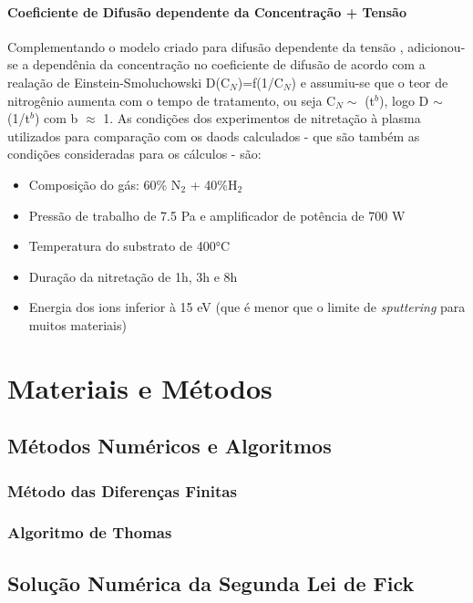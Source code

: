 \documentclass[]{politex}
\begin{document}
\subsubsection{Coeficiente de Difusão dependente da Concentração + Tensão}
\label{sec:comb-depc-stress}
	Complementando o modelo criado para difusão dependente da tensão \cite{galdikas2010stress}, adicionou-se a dependênia da concentração no coeficiente de difusão de acordo com a realação de Einstein-Smoluchowski D(C$_N$)=f(1/C$_N$) \cite{moskalioviene2012stress} e assumiu-se que o teor de nitrogênio aumenta com o tempo de tratamento, ou seja C$_N\sim$ (t$^b$), logo D $\sim$ (1/t$^b$) com b $\approx$ 1.
	As condições dos experimentos de nitretação à plasma utilizados para comparação com os daods calculados - que são também as condições consideradas para os cálculos - são: 
	\begin{itemize}
	 \item Composição do gás: 60\% N$_2$ + 40\%H$_2$
	 \item Pressão de trabalho de 7.5 Pa e amplificador de potência de 700 W
	 \item Temperatura do substrato de 400°C
	 \item Duração da nitretação de 1h, 3h e 8h
  	 \item Energia dos ions inferior à 15 eV (que é menor que o limite de \textit{sputtering} para muitos materiais)
	\end{itemize}
	

\chapter{Materiais e Métodos}
\section{Métodos Numéricos e Algoritmos}

\subsection{Método das Diferenças Finitas}
\label{sec:dif-fin}


\subsection{Algoritmo de Thomas}	
\label{sec:algo-thomas}


\section{Solução Numérica da Segunda Lei de Fick}
\label{sec:sol-numerica-2alei}

\end{document}
